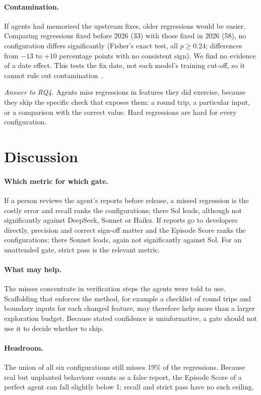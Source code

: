 \documentclass[sigconf]{acmart}
\newcommand{\answer}[2]{\smallskip\noindent\textit{Answer to RQ#1.} #2\smallskip}
\begin{document}
\paragraph{Contamination.}
If agents had memorised the upstream fixes, older regressions would be easier. Comparing regressions
fixed before 2026 (33) with those fixed in 2026 (58), no configuration differs significantly (Fisher's
exact test, all $p \ge 0.24$; differences from $-13$ to $+10$ percentage points with no consistent
sign). We find no evidence of a date effect. This tests the fix date, not each model's training
cut-off, so it cannot rule out contamination~\cite{sainz2023contamination}.

\answer{4}{Agents miss regressions in features they did exercise, because they skip the specific
check that exposes them: a round trip, a particular input, or a comparison with the correct value.
Hard regressions are hard for every configuration.}

\section{Discussion}

\paragraph{Which metric for which gate.}
If a person reviews the agent's reports before release, a missed regression is the costly error and
recall ranks the configurations; there Sol leads, although not significantly against DeepSeek, Sonnet
or Haiku. If reports go to developers directly, precision and correct sign-off matter and the Episode
Score ranks the configurations; there Sonnet leads, again not significantly against Sol. For an
unattended gate, strict pass is the relevant metric.

\paragraph{What may help.}
The misses concentrate in verification steps the agents were told to use. Scaffolding that enforces
the method, for example a checklist of round trips and boundary inputs for each changed feature, may
therefore help more than a larger exploration budget. Because stated confidence is uninformative, a
gate should not use it to decide whether to ship.

\paragraph{Headroom.}
The union of all six configurations still misses 19\% of the regressions. Because real but unplanted
behaviour counts as a false report, the Episode Score of a perfect agent can fall slightly below 1;
recall and strict pass have no such ceiling.
\end{document}
